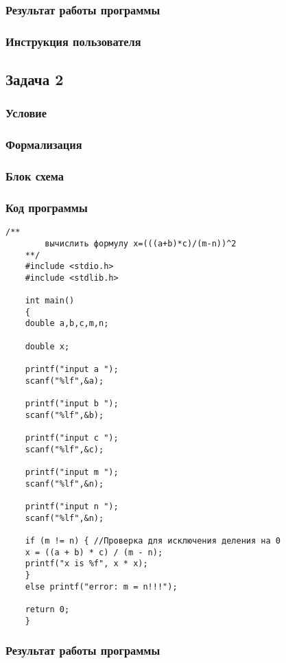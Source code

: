 \documentclass[simple,14pt]{eskdtext}
\begin{document}
	\subsubsection{Результат работы программы}
	\subsubsection{Инструкция пользователя}
	
    
	\subsection{Задача 2}
	\subsubsection{Условие}
	\subsubsection{Формализация}
	\subsubsection{Блок схема}
	\subsubsection{Код программы}
	\begin{lstlisting}[label=some-code2,caption=Задача 2]
	/**
		вычислить формулу x=(((a+b)*c)/(m-n))^2
	**/
	#include <stdio.h>
	#include <stdlib.h>
		
	int main()
	{
	double a,b,c,m,n;
		
	double x;
		
	printf("input a ");
	scanf("%lf",&a);
		
	printf("input b ");
	scanf("%lf",&b);
		
	printf("input c ");
	scanf("%lf",&c);
		
	printf("input m ");
	scanf("%lf",&n);
		
	printf("input n ");
	scanf("%lf",&n);
	
	if (m != n) { //Проверка для исключения деления на 0
	x = ((a + b) * c) / (m - n);
	printf("x is %f", x * x);
	}
	else printf("error: m = n!!!");
	
	return 0;
	}
	\end{lstlisting}
	\subsubsection{Результат работы программы}
\end{document}
